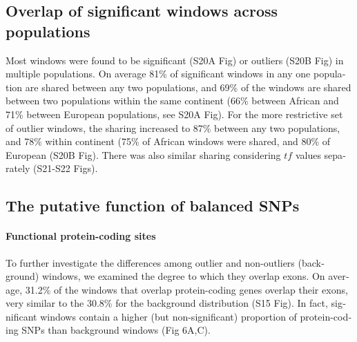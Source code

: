 \begin{refsection}
\begin{otherlanguage}{english}
\subsection{Overlap of significant windows across populations}
Most windows were found to be significant (S20A Fig) or outliers (S20B Fig) in multiple populations. On average 81\% of significant windows in any one population are shared between any two populations, and 69\% of the windows are shared between two populations within the same continent (66\% between African and 71\% between European populations, see S20A Fig). For the more restrictive set of outlier windows, the sharing increased to 87\% between any two populations, and 78\% within continent (75\% of African windows were shared, and 80\% of European (S20B Fig). There was also similar sharing considering $tf$ values separately (S21-S22 Figs).
\subsection{The putative function of balanced SNPs}
\paragraph{Functional protein-coding sites} To further investigate the differences among outlier and non-outliers (background) windows, we examined the degree to which they overlap exons. On average, 31.2\% of the windows that overlap protein-coding genes overlap their exons, very similar to the 30.8\% for the background distribution (S15 Fig). In fact, significant windows contain a higher (but non-significant) proportion of protein-coding SNPs than background windows (Fig 6A,C).



\end{otherlanguage}
\end{refsection}
